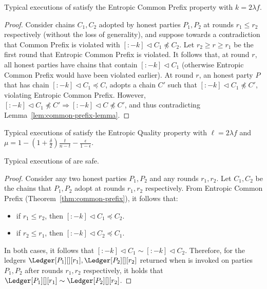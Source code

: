 \begin{theorem} \label{thm:common-prefix}
  Typical executions of \poem satisfy the Entropic Common Prefix property
  with $k = 2 \lambda f$.
\end{theorem}
\begin{proof}
  Consider chains $C_1, C_2$ adopted by honest parties $P_1, P_2$ at rounds $r_1 \leq r_2$ respectively
  (without the loss of generality), and suppose towards a contradiction that Common Prefix is violated with
  $[{:}{-k}] \lhd C_1 \not \preceq C_2$.
  Let $r_2 \geq r \geq r_1$ be the first round that Entropic Common Prefix is violated.
  It follows that, at round $r$, all honest parties have chains that contain $[{:}{-k}] \lhd C_1$
  (otherwise Entropic Common Prefix would have been violated earlier).
  At round $r$, an honest party $P$ that has chain $[{:}{-k}] \lhd C_1 \preceq C$, adopts
  a chain $C'$ such that $[{:}{-k}] \lhd C_1 \not \preceq C'$, violating Entropic Common Prefix.
  However, $[{:}{-k}] \lhd C_1 \not \preceq C' \Rightarrow [{:}{-k}] \lhd C \not \preceq C'$, and thus contradicting Lemma~\ref{lem:common-prefix-lemma}.
  \Qed
\end{proof}

\begin{theorem} \label{thm:entoropic-quality} 
  Typical executions of \poem satisfy the Entropic Quality property
  with $\ell = 2 \lambda f$ and
  $\mu = 1 - (1 + \frac{\delta}{2})\frac{t}{n - t} - \frac{\epsilon}{1 - \epsilon}$.
\end{theorem}

\begin{conjecture}
  Typical executions of \poem are safe.
\end{conjecture}
\begin{proof}
  Consider any two honest parties $P_1, P_2$ and
  any rounds $r_1, r_2$. Let $C_1, C_2$ be the chains that $P_1, P_2$
  adopt at rounds $r_1, r_2$ respectively.
  From Entropic Common Prefix (Theorem~\ref{thm:common-prefix}), it follows that:
  \begin{itemize}
    \item if $r_1 \leq r_2$, then $[{:}{-k}] \lhd C_1 \preccurlyeq C_2$.
    \item if $r_2 \leq r_1$, then $[{:}{-k}] \lhd C_2 \preccurlyeq C_1$.
  \end{itemize}
  In both cases, it follows that $[{:}{-k}] \lhd C_1 \sim [{:}{-k}] \lhd C_2$.
  Therefore, for the ledgers $\Ledger[P_1][][r_1], \Ledger[P_2][][r_2]$ returned when
  \lread is invoked on parties $P_1, P_2$ after rounds $r_1, r_2$ respectively,
  it holds that $\Ledger[P_1][][r_1] \sim \Ledger[P_2][][r_2]$.
\end{proof}

